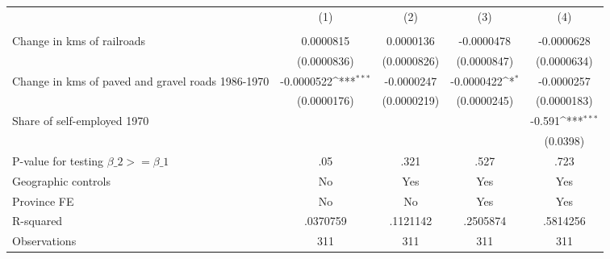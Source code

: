 {
\def\sym#1{\ifmmode^{#1}\else\(^{#1}\)\fi}
\begin{tabular}{l*{4}{c}}
\hline\hline
                &\multicolumn{1}{c}{(1)}&\multicolumn{1}{c}{(2)}&\multicolumn{1}{c}{(3)}&\multicolumn{1}{c}{(4)}\\
                &\multicolumn{1}{c}{}&\multicolumn{1}{c}{}&\multicolumn{1}{c}{}&\multicolumn{1}{c}{}\\
\hline
Change in kms of railroads&0.0000815         &0.0000136         &-0.0000478         &-0.0000628         \\
                &(0.0000836)         &(0.0000826)         &(0.0000847)         &(0.0000634)         \\
[1em]
Change in kms of paved and gravel roads 1986-1970&-0.0000522\sym{***}&-0.0000247         &-0.0000422\sym{*}  &-0.0000257         \\
                &(0.0000176)         &(0.0000219)         &(0.0000245)         &(0.0000183)         \\
[1em]
Share of self-employed 1970&                  &                  &                  &   -0.591\sym{***}\\
                &                  &                  &                  & (0.0398)         \\
\hline
P-value for testing $\beta\_{2} >= \beta\_{1}$&      .05         &     .321         &     .527         &     .723         \\
Geographic controls&       No         &      Yes         &      Yes         &      Yes         \\
Province FE     &       No         &       No         &      Yes         &      Yes         \\
R-squared       & .0370759         & .1121142         & .2505874         & .5814256         \\
Observations    &      311         &      311         &      311         &      311         \\
\hline\hline
\end{tabular}
}
